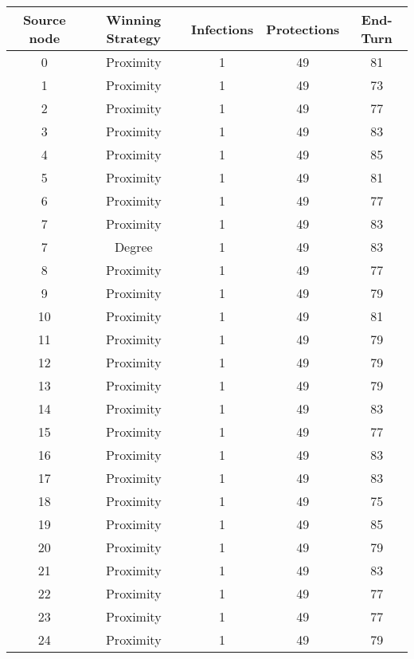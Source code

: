 \documentclass[results.tex]{subfiles}
\begin{document}
\begin{center}
  \begin{tabular}{| c || c | c | c | c |}
    \hline
    {\bfseries Source node} & {\bfseries Winning Strategy} & {\bfseries Infections} & {\bfseries Protections} & {\bfseries End-Turn} \\  %
    \hline\hline
    0 & Proximity & 1 & 49 & 81 \\ 
    \hline
    1 & Proximity & 1 & 49 & 73 \\ 
    \hline
    2 & Proximity & 1 & 49 & 77 \\ 
    \hline
    3 & Proximity & 1 & 49 & 83 \\ 
    \hline
    4 & Proximity & 1 & 49 & 85 \\ 
    \hline
    5 & Proximity & 1 & 49 & 81 \\ 
    \hline
    6 & Proximity & 1 & 49 & 77 \\ 
    \hline
    7 & Proximity & 1 & 49 & 83 \\ 
    \hline
    7 & Degree & 1 & 49 & 83 \\ 
    \hline
    8 & Proximity & 1 & 49 & 77 \\ 
    \hline
    9 & Proximity & 1 & 49 & 79 \\ 
    \hline
    10 & Proximity & 1 & 49 & 81 \\ 
    \hline
    11 & Proximity & 1 & 49 & 79 \\ 
    \hline
    12 & Proximity & 1 & 49 & 79 \\ 
    \hline
    13 & Proximity & 1 & 49 & 79 \\ 
    \hline
    14 & Proximity & 1 & 49 & 83 \\ 
    \hline
    15 & Proximity & 1 & 49 & 77 \\ 
    \hline
    16 & Proximity & 1 & 49 & 83 \\ 
    \hline
    17 & Proximity & 1 & 49 & 83 \\ 
    \hline
    18 & Proximity & 1 & 49 & 75 \\ 
    \hline
    19 & Proximity & 1 & 49 & 85 \\ 
    \hline
    20 & Proximity & 1 & 49 & 79 \\ 
    \hline
    21 & Proximity & 1 & 49 & 83 \\ 
    \hline
    22 & Proximity & 1 & 49 & 77 \\ 
    \hline
    23 & Proximity & 1 & 49 & 77 \\ 
    \hline
    24 & Proximity & 1 & 49 & 79 \\ 

\end{tabular}
\end{center}
\end{document}
